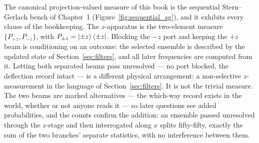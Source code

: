 The canonical projection-valued measure of this book is the sequential Stern--Gerlach bench of Chapter~1 (Figure~\ref{fig:sequential_sg}), and it exhibits every clause of the bookkeeping. The $z$-apparatus is the two-element measure $\{P_{+z}, P_{-z}\}$, with $P_{\pm z} = \ket{\pm z}\bra{\pm z}$. Blocking the $-z$ port and keeping the $+z$ beam is conditioning on an outcome: the selected ensemble is described by the updated state of Section~\ref{sec:filters}, and all later frequencies are computed from it. Letting both separated beams pass unresolved --- no port blocked, the deflection record intact --- is a different physical arrangement: a non-selective $z$-measurement in the language of Section~\ref{sec:filters}. It is not the trivial measure. The two beams are marked alternatives --- the which-way record exists in the world, whether or not anyone reads it --- so later questions see added probabilities, and the counts confirm the addition: an ensemble passed unresolved through the $z$-stage and then interrogated along $x$ splits fifty-fifty, exactly the sum of the two branches' separate statistics, with no interference between them.

